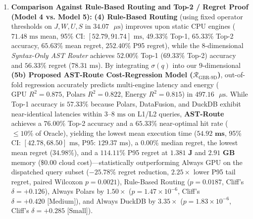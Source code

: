 \documentclass[10pt,a4paper]{article}
\begin{document}
\begin{enumerate}[leftmargin=1.5em,itemsep=2pt]
    \item \textbf{Comparison Against Rule-Based Routing and Top-2 / Regret Proof (Model 4 vs. Model 5):} \textbf{(4) Rule-Based Routing} (using fixed operator thresholds on $J, W, U, S$ in $34.07\text{ }\mu\text{s}$) improves upon static CPU engines ($71.48\text{ ms}$ mean, 95\% CI: $[52.79, 91.74]\text{ ms}$, $49.33\%$ Top-1, $65.33\%$ Top-2 accuracy, $65.63\%$ mean regret, $252.40\%$ P95 regret), while the 8-dimensional \emph{Syntax-Only AST Router} achieves $52.00\%$ Top-1 ($69.33\%$ Top-2) accuracy and $56.33\%$ regret ($78.31\text{ ms}$). By integrating $\sigma(q)$ into our 9-dimensional \textbf{(5b) Proposed AST-Route Cost-Regression Model ($\mathcal{R}_{\text{GBR-9D}}$)}, out-of-fold regression accurately predicts multi-engine latency and energy ($\text{GPU } R^2 = \mathbf{0.875}$, $\text{Polars } R^2 = \mathbf{0.822}$, $\text{Energy } R^2 = \mathbf{0.815}$) in $497.16\text{ }\mu\text{s}$. While Top-1 accuracy is $\mathbf{57.33\%}$ because Polars, DataFusion, and DuckDB exhibit near-identical latencies within $3\text{--}8\text{ ms}$ on L1/L2 queries, \textbf{AST-Route} achieves a $\mathbf{76.00\%}$ Top-2 accuracy and a $\mathbf{65.33\%}$ near-optimal hit rate ($\le 10\%$ of Oracle), yielding the lowest mean execution time ($\mathbf{54.92\text{ ms}}$, 95\% CI: $[42.78, 68.50]\text{ ms}$, P95: $129.37\text{ ms}$), a $\mathbf{0.00\%}$ median regret, the lowest mean regret ($\mathbf{34.98\%}$), and a $\mathbf{114.11\%}$ P95 regret at $\mathbf{1.381\text{ J}}$ and $\mathbf{2.91\text{ GB}}$ memory ($\mathbf{\$0.00}$ cloud cost)---statistically outperforming Always GPU on the dispatched query subset ($-25.78\%$ regret reduction, $2.25\times$ lower P95 tail regret, paired Wilcoxon $p = \mathbf{0.0021}$), Rule-Based Routing ($p = 0.0187$, Cliff's $\delta = +0.126$), Always Polars by $\mathbf{1.50\times}$ ($p = 1.47 \times 10^{-6}$, Cliff's $\delta = +0.420\text{ [Medium]}$), and Always DuckDB by $\mathbf{3.35\times}$ ($p = 1.83 \times 10^{-6}$, Cliff's $\delta = +0.285\text{ [Small]}$).

\end{enumerate}
\end{document}
